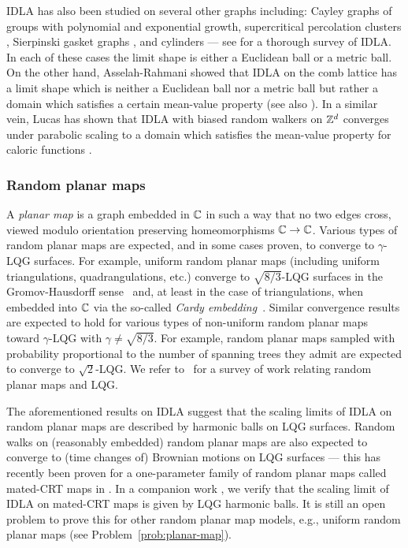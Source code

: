 \documentclass[12pt]{amsart}
\numberwithin{equation}{section}
\begin{document}
	IDLA has also been studied on several other graphs including: Cayley graphs of groups with polynomial \cite{blachere2001internal} and  exponential \cite{blachere2007internal, huss2008internal} growth, supercritical percolation clusters \cite{shellef2010idla, duminil2013containing}, Sierpinski gasket graphs \cite{chen2017internal}, and cylinders \cite{jerison2014chapter, levine2019long, silvestri2020internal}--- see \cite{sava2021fractals} for a thorough survey of IDLA. In each of these cases the limit shape is either a Euclidean ball or a metric ball. On the other hand, Asselah-Rahmani showed that IDLA on the comb lattice has a limit shape which is neither a Euclidean ball nor a metric ball but rather a domain which satisfies a certain mean-value property \cite{asselah2016fluctuations} (see also \cite{huss-sava-comb}). 
	In a similar vein, Lucas has shown that IDLA with biased random walkers on $\mathbb{Z}^d$ converges under parabolic scaling to a domain which satisfies the mean-value property for caloric functions \cite{lucas2014limiting}.  
	
	\subsubsection{Random planar maps}
	A \textit{planar map} is a graph embedded in $\mathbb{C}$ in such a way that no two edges cross, viewed modulo orientation preserving homeomorphisms $\mathbb{C} \rightarrow \mathbb{C}$. 
	Various types of random planar maps are expected, and in some cases proven, to converge to $\gamma$-LQG surfaces. For example, uniform random planar maps (including uniform triangulations, quadrangulations, etc.) converge to $\sqrt{8/3}$-LQG surfaces in the Gromov-Hausdorff sense~\cite{legall-uniqueness,miermont-brownian-map,lqg-tbm1,lqg-tbm2} and, at least in the case of triangulations, when embedded into $\mathbb{C}$ via the so-called \textit{Cardy embedding}~\cite{hs-cardy-embedding}. Similar convergence results are expected to hold for various types of non-uniform random planar maps toward $\gamma$-LQG with $\gamma\not=\sqrt{8/3}$. For example, random planar maps sampled with probability proportional to the number of spanning trees they admit are expected to converge to $\sqrt 2$-LQG. We refer to~\cite{ghs-mating-survey} for a survey of work relating random planar maps and LQG. 
	
	
	The aforementioned results on IDLA suggest that the scaling limits of IDLA on random planar maps are described by harmonic balls on LQG surfaces. 
	Random walks on (reasonably embedded) random planar maps are also expected to converge to (time changes of) Brownian motions on LQG surfaces
	--- this has recently been proven for a one-parameter family of random planar maps called mated-CRT maps in \cite{gms-tutte,berestycki2020random}.   
	In a companion work \cite{bou2022idla}, we verify that the scaling limit of IDLA on mated-CRT maps is given by LQG harmonic balls. It is still an open problem to prove this for other random planar map models, e.g., uniform random planar maps (see Problem~\ref{prob:planar-map}). 
	
\end{document}
